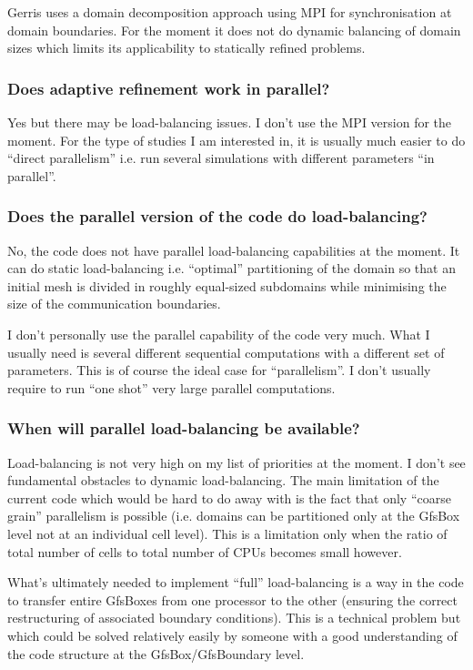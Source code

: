 \documentclass[a4paper]{article}
\begin{document}
Gerris uses a domain decomposition approach using MPI for
synchronisation at domain boundaries. For the moment it does not do
dynamic balancing of domain sizes which limits its applicability to
statically refined problems.

\subsubsection{Does adaptive refinement work in parallel?}

Yes but there may be load-balancing issues. I
don't use the MPI version for the moment. For the type of studies I am
interested in, it is usually much easier to do ``direct parallelism''
i.e. run several simulations with different parameters ``in parallel''.

\subsubsection{Does the parallel version of the code do load-balancing?}

No, the code does not have parallel load-balancing capabilities at the
moment. It can do static load-balancing i.e. ``optimal'' partitioning of
the domain so that an initial mesh is divided in roughly equal-sized
subdomains while minimising the size of the communication boundaries.

I don't personally use the parallel capability of the code very
much. What I usually need is several different sequential computations
with a different set of parameters. This is of course the ideal case
for ``parallelism''. I don't usually require to run ``one shot'' very
large parallel computations.

\subsubsection{When will parallel load-balancing be available?}

Load-balancing is not very high on my list of priorities at the
moment. I don't see fundamental obstacles to dynamic
load-balancing. The main limitation of the current code which would be
hard to do away with is the fact that only ``coarse grain'' parallelism
is possible (i.e. domains can be partitioned only at the GfsBox level
not at an individual cell level). This is a limitation only when the
ratio of total number of cells to total number of CPUs becomes small
however.

What's ultimately needed to implement ``full'' load-balancing is a way
in the code to transfer entire GfsBoxes from one processor to the
other (ensuring the correct restructuring of associated boundary
conditions). This is a technical problem but which could be solved
relatively easily by someone with a good understanding of the code
structure at the GfsBox/GfsBoundary level.
\end{document}
